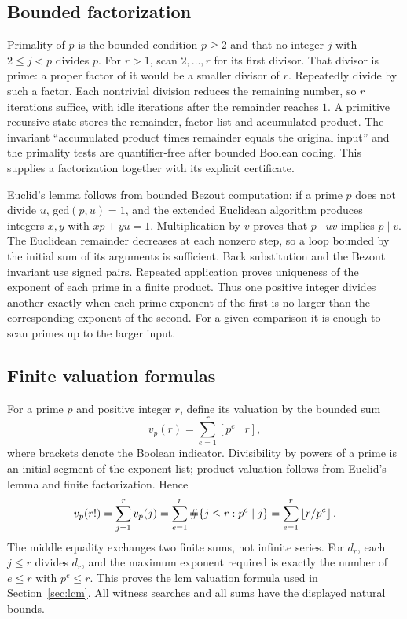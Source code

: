 \documentclass[11pt]{article}
\theoremstyle{definition}\newtheorem{definition}[theorem]{Definition}
\theoremstyle{remark}\newtheorem{remark}[theorem]{Remark}
\begin{document}
\subsection{Bounded factorization}
Primality of $p$ is the bounded condition $p\ge2$ and that no integer
$j$ with $2\le j<p$ divides $p$. For $r>1$, scan $2,\ldots,r$ for its
first divisor. That divisor is prime: a proper factor of it would be a
smaller divisor of $r$. Repeatedly divide by such a factor. Each nontrivial
division reduces the remaining number, so $r$ iterations suffice, with
idle iterations after the remainder reaches $1$. A primitive recursive
state stores the remainder, factor list and accumulated product. The
invariant ``accumulated product times remainder equals the original input''
and the primality tests are quantifier-free after bounded Boolean coding.
This supplies a factorization together with its explicit certificate.

Euclid's lemma follows from bounded Bezout computation: if a prime $p$
does not divide $u$, gcd$(p,u)=1$, and the extended Euclidean algorithm
produces integers $x,y$ with $xp+yu=1$. Multiplication by $v$ proves that
$p\mid uv$ implies $p\mid v$. The Euclidean remainder decreases at each
nonzero step, so a loop bounded by the initial sum of its arguments is
sufficient. Back substitution and the Bezout invariant use signed pairs.
Repeated application proves uniqueness of the exponent of each prime in
a finite product. Thus one positive integer divides another exactly when
each prime exponent of the first is no larger than the corresponding
exponent of the second. For a given comparison it is enough to scan primes
up to the larger input.

\subsection{Finite valuation formulas}
For a prime $p$ and positive integer $r$, define its valuation by the bounded
sum
\[
 v_p(r)=\sum_{e=1}^{r}[p^e\mid r],
\]
where brackets denote the Boolean indicator. Divisibility by powers of a
prime is an initial segment of the exponent list; product valuation follows
from Euclid's lemma and finite factorization. Hence
\[
 v_p(r!)=\sum_{j=1}^{r}v_p(j)
        =\sum_{e=1}^{r}\#\{j\le r:p^e\mid j\}
        =\sum_{e=1}^{r}\left\lfloor r/p^e\right\rfloor.
\]
The middle equality exchanges two finite sums, not infinite series.
For $d_r$, each $j\le r$ divides $d_r$, and the maximum exponent required
is exactly the number of $e\le r$ with $p^e\le r$. This proves the lcm
valuation formula used in Section~\ref{sec:lcm}. All witness searches and
all sums have the displayed natural bounds.
\end{document}
